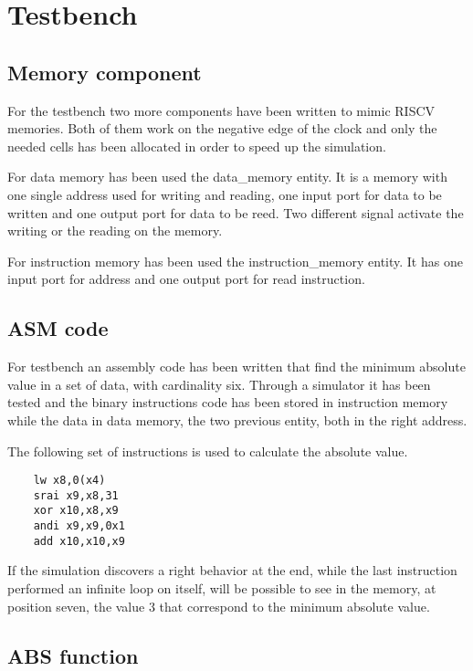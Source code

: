%
\chapter{Testbench}
\label{cha5}

\section{Memory component}

For the testbench two more components have been written to mimic RISCV memories. Both of them
work on the negative edge of the clock and only the needed cells has been allocated in order 
to speed up the simulation.

For data memory has been used the data\_memory entity. It is a memory with one single address used
for writing and reading, one input port for data to be written and one output port 
for data to be reed. Two different signal activate the writing or the reading on the memory.

For instruction memory has been used the instruction\_memory entity. It has one input port
for address and one output port for read instruction.

\section{ASM code}

For testbench an assembly code has been written that find the minimum absolute value in a 
set of data, with cardinality six. Through a simulator it has been tested and the binary instructions code has been 
stored in instruction memory while the data in data memory, the two previous entity, both in the right address.

The following set of instructions is used to calculate the absolute value.
\begin{lstlisting}
    lw x8,0(x4)       
    srai x9,x8,31     
    xor x10,x8,x9     
    andi x9,x9,0x1    
    add x10,x10,x9   
\end{lstlisting}

If the simulation discovers a right behavior at the end, while the last instruction performed an infinite loop 
on itself, will be possible to see in the memory, at position seven, the value 3 that correspond to the minimum 
absolute value.

\section{ABS function}

